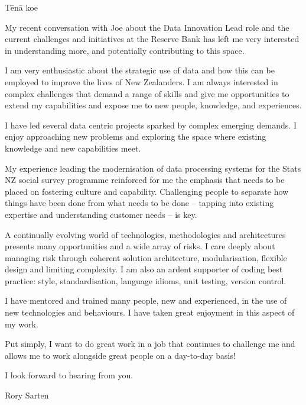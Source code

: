 \documentclass{article}[10pt] %
\begin{document}
\begin{minipage}{1\textwidth }
\vspace{20pt}

Tēnā koe

\vspace{10pt}
My recent conversation with Joe about the Data Innovation Lead role and the current challenges and initiatives at the Reserve Bank has left me very interested in understanding more, and potentially contributing to this space.

\vspace{10pt}
I am very enthusiastic about the strategic use of data and how this can be employed to improve the lives of New Zealanders. I am always interested in complex challenges that demand a range of skills and give me opportunities to extend my capabilities and expose me to new people, knowledge, and experiences.

\vspace{10pt}
I have led several data centric projects sparked by complex emerging demands. I enjoy approaching new problems and exploring the space where existing knowledge and new capabilities meet.

\vspace{10pt}
My experience leading the modernisation of data processing systems for the Stats NZ social survey programme reinforced for me the emphasis that needs to be placed on fostering culture and capability. Challenging people to separate how things have been done from what needs to be done – tapping into existing expertise and understanding customer needs – is key.

\vspace{10pt}
A continually evolving world of technologies, methodologies and architectures presents many opportunities and a wide array of risks. I care deeply about managing risk through coherent solution architecture, modularisation, flexible design and limiting complexity. I am also an ardent supporter of coding best practice: style, standardisation, language idioms, unit testing, version control.

\vspace{10pt}
I have mentored and trained many people, new and experienced, in the use of new technologies and behaviours. I have taken great enjoyment in this aspect of my work.

\vspace{10pt}
Put simply, I want to do great work in a job that continues to challenge me and allows me to work alongside great people on a day-to-day basis!

\vspace{10pt}
I look forward to hearing from you.


\vspace{10pt}
Rory Sarten

\end{minipage}



\end{document}
